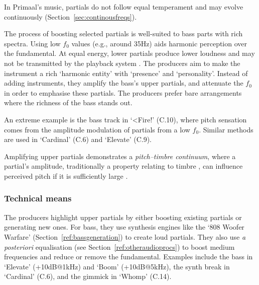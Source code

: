 \documentclass{article}
\begin{document}

In Primaal's music, partials do not follow equal temperament and may evolve continuously (Section~\ref{sec:continousfreqs}). %

The process of boosting selected partials is well-suited to bass parts with rich spectra. Using low $f_0$ values (e.g., around 35Hz) aids harmonic perception over the fundamental. At equal energy, lower partials produce lower loudness \citep{iso2262023} and may not be transmitted by the playback system \citep{deruty2024storch}. The producers aim to make the instrument a rich `harmonic entity' with `presence' and `personality'. Instead of adding instruments, they amplify the bass's upper partials, and attenuate the $f_0$ in order to emphasise these partials. The producers prefer bare arrangements where the richness of the bass stands out.

An extreme example is the bass track in `<Fire!' (C.10), where pitch sensation comes from the amplitude modulation of partials from a low $f_0$. Similar methods are used in `Cardinal' (C.6) and `Elevate' (C.9).

Amplifying upper partials demonstrates a \textit{pitch--timbre continuum}, where a partial's amplitude, traditionally a property relating to timbre \citep{peeters2011timbre}, can influence perceived pitch if it is sufficiently large \citep[p. 1706]{yost2009pitch}.

\subsubsection{Technical means}



The producers highlight upper partials by either boosting existing partials or generating new ones. For bass, they use synthesis engines like the `808 Woofer Warfare' (Section~\ref{ref:bassgeneration}) to create loud partials. They also use \textit{a posteriori} equalisation (see Section~\ref{ref:otheraudioprocs}) to boost medium frequencies and reduce or remove the fundamental. Examples include the bass in `Elevate' (+10dB@1kHz) and `Boom' (+10dB@5kHz), the synth break in `Cardinal' (C.6), and the gimmick in `Whomp' (C.14).
\end{document}
